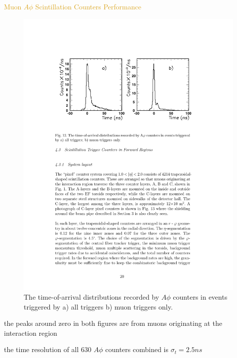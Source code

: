 \begin{frame}{\textcolor{Goldenrod}{Muon $A\phi$ Scintillation Counters Performance }}
  \begin{overlayarea}{\textwidth}{\textheight}
    \begin{figure}[h]\centering
      \includegraphics[height=0.35\textheight]{./Images/46_MD_Scint_03}
    \caption*{{\scriptsize The time-of-arrival distributions recorded by $A\phi$ counters in
        events triggered by a) all triggers b) muon triggers only.}}
    \end{figure}
    
    \itt
  \item the peaks around zero in both figures are from muons
    originating at the interaction region
  \item
    \alert{the time resolution of all $630$ $A\phi$ counters combined is
    $\sigma_t = 2.5 ns$}
    
   \tti
  \end{overlayarea}
\end{frame}


